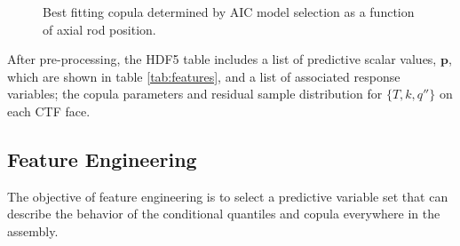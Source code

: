 \begin{figure}[H]%
    \centering
    \qquad
    \qquad
    \qquad
    \qquad
    \caption[Best fitting copula to CFD data.]{Best fitting copula determined by AIC model selection as a function of axial rod position.}%
    \label{fig:copula_predicted}%
\end{figure}

After pre-processing, the HDF5 table includes a list of predictive scalar values, $\mathbf p$, which are shown in table \ref{tab:features}, and a list of associated response variables; the copula parameters and residual sample distribution for $\{T,k,q''\}$ on each CTF face.

\subsection{Feature Engineering}

The objective of feature engineering is to select a predictive variable set that can describe the behavior of the conditional quantiles and copula everywhere in the assembly.

